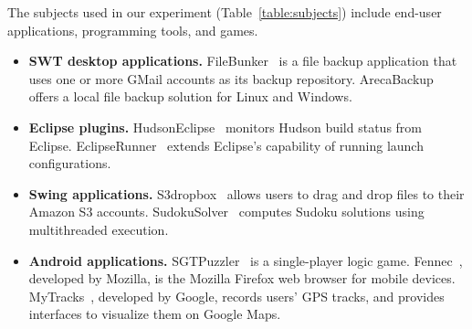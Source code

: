 The subjects used in our experiment (Table~\ref{table:subjects})
include end-user applications, programming tools, and games. 

\vspace{-5pt}

\begin{itemize}%
\item \textbf{SWT desktop applications.}
FileBunker~\cite{filebunker} is a file backup application that uses one or more GMail
accounts as its backup repository. ArecaBackup~\cite{areca} offers a local
file backup solution for Linux and Windows.


\item \textbf{Eclipse plugins.}
HudsonEclipse~\cite{hudson} monitors Hudson build status from Eclipse.
EclipseRunner~\cite{eclipserunner} extends Eclipse's capability of running launch configurations.


\item \textbf{Swing applications.} %
S3dropbox~\cite{s3dropbox}  allows users
to drag and drop files to their Amazon S3 accounts. SudokuSolver~\cite{sudokusolver}
computes Sudoku solutions using multithreaded execution. 


\item  \textbf{Android applications.} %
SGTPuzzler~\cite{sgtpuzzles} is a single-player logic game.
Fennec~\cite{fennec}, developed by Mozilla, is the Mozilla
Firefox web browser for mobile devices. 
MyTracks~\cite{mytracks}, developed by Google, records users' GPS tracks, and provides
interfaces to visualize them on Google Maps. 

\end{itemize}



